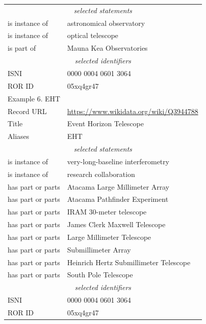 \documentclass[11pt,a4paper]{ivoa}
\begin{document}
\begin{longtable}{p{}p{}}
\multicolumn{2}{c}{\sl selected statements}\\
is instance of & astronomical observatory \\
is instance of & optical telescope \\
is part of & Mauna Kea Observatories\\
\multicolumn{2}{c}{\sl selected identifiers}\\
ISNI       & 0000 0004 0601 3064\\
ROR ID     & 05xq4gr47 \\
\hline
\hline
\multicolumn{2}{l}{Example 6. EHT}\\
\hline
Record URL & \url{https://www.wikidata.org/wiki/Q3944788}\\
Title      & Event Horizon Telescope\\
Aliases    & EHT\\
\multicolumn{2}{c}{\sl selected statements}\\
is instance of & very-long-baseline interferometry \\
is instance of & research collaboration \\
has part or parts & Atacama Large Millimeter Array\\
has part or parts & Atacama Pathfinder Experiment\\
has part or parts & IRAM 30-meter telescope\\
has part or parts & James Clerk Maxwell Telescope\\
has part or parts & Large Millimeter Telescope\\
has part or parts & Submillimeter Array\\
has part or parts & Heinrich Hertz Submillimeter Telescope\\
has part or parts & South Pole Telescope\\ 
\multicolumn{2}{c}{\sl selected identifiers}\\
ISNI       & 0000 0004 0601 3064\\
ROR ID     & 05xq4gr47 \\
\hline
\end{longtable}
\end{document}

